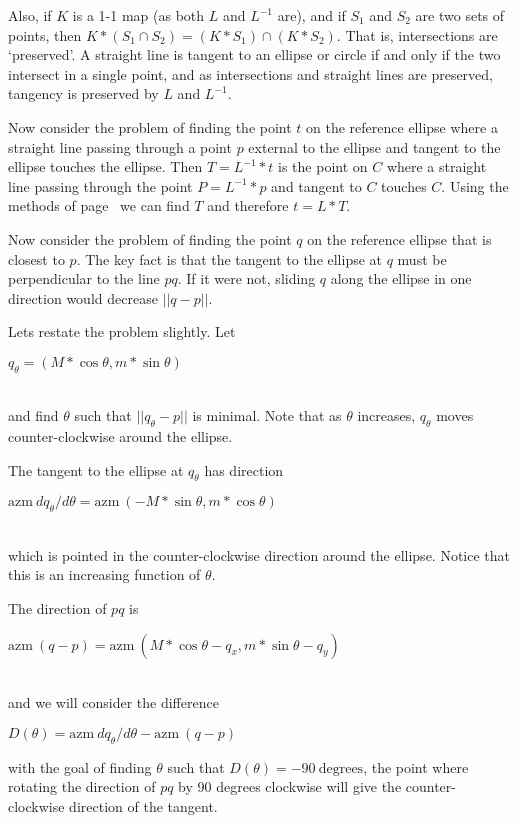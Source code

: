 \documentclass[12pt]{article}
\begin{document}
Also, if $K$ is a 1-1 map (as both $L$ and $L^{-1}$ are),
and if $S_1$ and $S_2$ are two sets of points, then
$K*(S_1\cap S_2) = (K*S_1)\cap(K*S_2)$.
That is, intersections are `preserved'.  A straight line is tangent
to an ellipse or circle if and only if the two intersect in a single
point, and as intersections and straight lines are preserved, tangency
is preserved by $L$ and $L^{-1}$.

Now consider the problem of finding the point $t$ on the reference ellipse
where a straight line passing through a point $p$ external to the
ellipse and tangent to the ellipse touches the ellipse.  Then
$T=L^{-1}*t$ is the point on $C$ where a straight line passing through
the point $P=L^{-1}*p$ and tangent to $C$ touches $C$.  Using the
methods of page~\pageref{FINDING-TANGENT-POINT} we can find $T$ and
therefore $t=L*T$.

Now consider the problem of finding the point $q$ on the reference ellipse
that is closest to $p$.
The key fact is that the tangent to the ellipse at $q$ must be perpendicular
to the line $pq$.  If it were not, sliding $q$ along the ellipse in one
direction would decrease $||q-p||$.

Lets restate the problem slightly.  Let \\
\centerline{$q_\theta = (M*\cos\theta,m*\sin\theta)$} \\
and find $\theta$ such that $||q_\theta - p||$ is minimal.
Note that as $\theta$ increases, $q_\theta$ moves counter-clockwise
around the ellipse.

The tangent to the ellipse at $q_\theta$ has direction \\
\centerline{$\mathrm{azm}~dq_\theta/d\theta =
             \mathrm{azm}~(-M*\sin\theta,m*\cos\theta)$} \\
which is pointed in the counter-clockwise direction around the
ellipse.  Notice that this is an increasing function of $\theta$.

The direction of $pq$ is \\
\centerline{$\mathrm{azm}~(q-p) =
             \mathrm{azm}~(M*\cos\theta - q_x,m*\sin\theta - q_y)$} \\
and we will consider the difference \\
\centerline{$D(\theta) = \mathrm{azm}~dq_\theta/d\theta - \mathrm{azm}~(q-p)$}
with the goal of finding $\theta$ such that $D(\theta) = -90~\mathrm{degrees}$,
the point where rotating the direction of $pq$ by 90 degrees clockwise
will give the counter-clockwise direction of the tangent.
\end{document}
